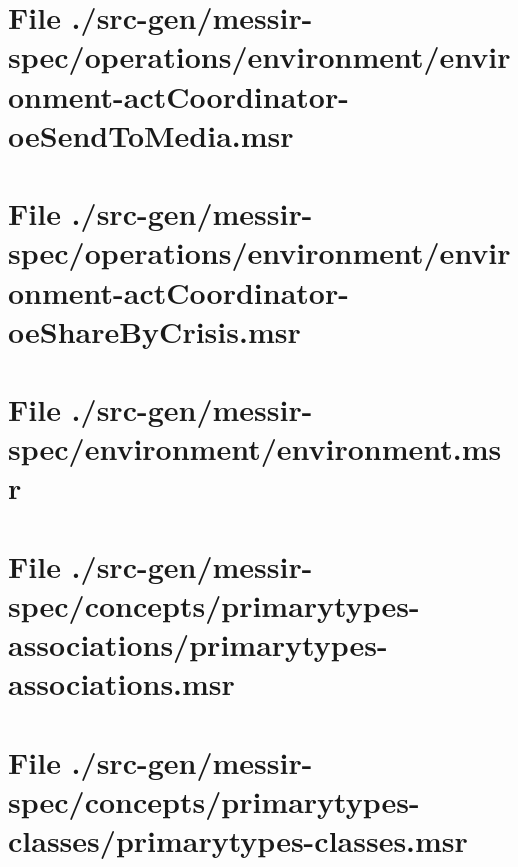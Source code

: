 \section[File /src-gen/messir-spec.../environment-actCoordinator-oeSendToMedia.msr]{File ./src-gen/messir-spec/operations/environment/environment-actCoordinator-oeSendToMedia.msr}
\scriptsize

\normalsize
	
\section[File /src-gen/messir-spec.../environment-actCoordinator-oeShareByCrisis.msr]{File ./src-gen/messir-spec/operations/environment/environment-actCoordinator-oeShareByCrisis.msr}
\scriptsize

\normalsize
	
\section[File /src-gen/messir-spec/environment/environment.msr]{File ./src-gen/messir-spec/environment/environment.msr}
\scriptsize

\normalsize
	
\section[File /src-gen/messir-spec/concepts.../primarytypes-associations.msr]{File ./src-gen/messir-spec/concepts/primarytypes-associations/primarytypes-associations.msr}
\scriptsize

\normalsize
	
\section[File /src-gen/messir-spec/concepts/primarytypes-classes/primarytypes-classes.msr]{File ./src-gen/messir-spec/concepts/primarytypes-classes/primarytypes-classes.msr}
\scriptsize

\normalsize
	
